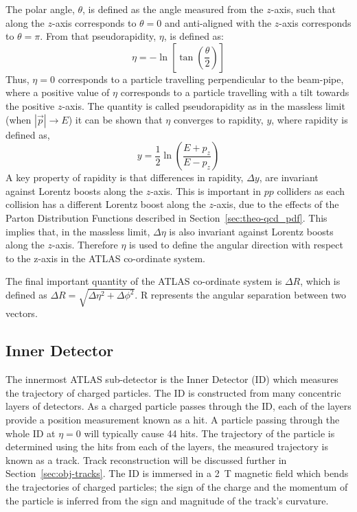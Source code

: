 The polar angle, $\theta$, is defined as the angle measured from the $z$-axis,
such that along the $z$-axis corresponds to $\theta = 0$
and anti-aligned with the $z$-axis corresponds to $\theta = \pi$.
From that pseudorapidity, $\eta$, is defined as:
\begin{equation}
 \eta = -\ln\left[\tan\left( \frac{\theta}{2} \right) \right]
\end{equation}
Thus, $\eta = 0$ corresponds to a particle travelling perpendicular to the beam-pipe,
where a positive value of $\eta$ corresponds to a particle travelling with a tilt towards the positive $z$-axis.
The quantity is called pseudorapidity as in the massless limit (when $|\vec{p}| \to E$)
it can be shown that $\eta$ converges to rapidity, $y$, where rapidity is defined as,
\begin{equation}
  y = \frac{1}{2} \ln \left( \frac{E+p_{z}}{E-p_{z}} \right)
\end{equation}
A key property of rapidity is that differences in rapidity, $\Delta y$, are invariant against Lorentz boosts along the $z$-axis.
This is important in $pp$ colliders as each collision has  a different Lorentz boost along the $z$-axis,
due to the effects of the Parton Distribution Functions described in Section~\ref{sec:theo-qcd_pdf}.
This implies that, in the massless limit, $\Delta \eta$ is also invariant against Lorentz boosts along the $z$-axis.
Therefore $\eta$ is used to define the angular direction with respect to the z-axis in the ATLAS co-ordinate system.

The final important quantity of the ATLAS co-ordinate system is $\Delta R$, which is defined as $\Delta R = \sqrt{\Delta\eta^{2} + \Delta\phi^{2}}$.  
\Delta R represents the angular separation between two vectors.



\subsection{Inner Detector}
\label{sec:det-ID}

The innermost ATLAS sub-detector is the Inner Detector (ID) which
measures the trajectory of charged particles.
The ID is constructed from many concentric layers of detectors.
As a charged particle passes through the ID, each of the layers provide a position measurement known as a hit.
A particle passing through the whole ID at $\eta=0$ will typically cause 44 hits. %
The trajectory of the particle is determined using the hits from each of the layers,
the measured trajectory is known as a track. Track reconstruction will be discussed further in Section~\ref{sec:obj-tracks}.
The ID is immersed in a 2~T magnetic field which bends the trajectories of charged particles;
the sign of the charge and the momentum of the particle is inferred from the sign and magnitude of the track's curvature.


